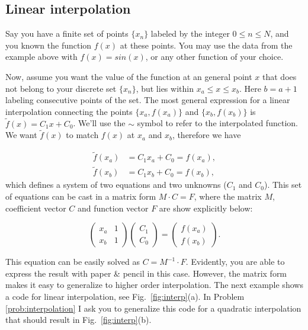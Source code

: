 \subsection*{Linear interpolation}

Say you have a finite set of points $\{x_n\}$ labeled by the integer $0 \leq n \leq N$, and you known the function $f(x)$ at these points. You may use the data from the example above with $f(x) = sin(x)$, or any other function of your choice.

Now, assume you want the value of the function at an general point $x$ that does not belong to your discrete set $\{x_n\}$, but lies within $x_a \leq x \leq x_b$. Here $b=a+1$ labeling consecutive points of the set. The most general expression for a linear interpolation connecting the points $\{x_a, f(x_a)\}$ and $\{x_b, f(x_b)\}$ is $\tilde{f}(x) = C_1 x+C_0$. We'll use the $\sim$ symbol to refer to the interpolated function. We want  $\tilde{f}(x)$ to match $f(x)$ at $x_a$ and $x_b$, therefore we have

\begin{align}
 \tilde{f}(x_a) &= C_1 x_a + C_0 = f(x_a),\\
 \tilde{f}(x_b) &= C_1 x_b + C_0 = f(x_b),
\end{align}
which defines a system of two equations and two unknowns ($C_1$ and $C_0$). This set of equations can be cast in a matrix form $M\cdot C = F$, where the matrix $M$, coefficient vector $C$ and function vector $F$ are show explicitly below:

\begin{equation}
 \begin{pmatrix}
  x_a & 1\\
  x_b & 1
 \end{pmatrix}
 \begin{pmatrix}
  C_1 \\ C_0
 \end{pmatrix}
 =
 \begin{pmatrix}
  f(x_a) \\ f(x_b)
 \end{pmatrix}.
\end{equation}

This equation can be easily solved as $C = M^{-1}\cdot F$. Evidently, you are able to express the result with paper \& pencil in this case. However, the matrix form makes it easy to generalize to higher order interpolation. The next example shows a code for linear interpolation, see Fig.~\ref{fig:interp}(a). In Problem \ref{prob:interpolation} I ask you to generalize this code for a quadratic interpolation that should result in Fig.~\ref{fig:interp}(b). 

